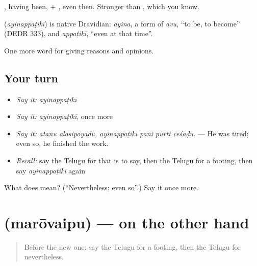 , having been, + , even then. Stronger than , which you know.

\begin{cousinweb}
\textbf{} (\emph{ayinappaṭikī}) is native Dravidian: \emph{ayina}, a form of \emph{avu}, \textquotedblleft{}to be, to become\textquotedblright{} (DEDR 333), and \emph{appaṭikī}, \textquotedblleft{}even at that time\textquotedblright{}.
\end{cousinweb}

\begin{grammarlens}[title={What you've built}]
One more word for giving reasons and opinions.
\end{grammarlens}

\subsection*{Your turn}
\begin{itemize}
\raggedright
  \item \emph{Say it:} \emph{ayinappaṭikī}
  \item \emph{Say it:} \emph{ayinappaṭikī}, once more
  \item \emph{Say it:} \emph{atanu alasipōyāḍu, ayinappaṭikī pani pūrti cēśāḍu.} — He was tired; even so, he finished the work.
  \item \emph{Recall:} say the Telugu for that is to say, then the Telugu for a footing, then say \emph{ayinappaṭikī} again
\end{itemize}

\begin{tcolorbox}[breakable,colback=teal!4,colframe=teal!35!black,title={Before you move on}]
What does  mean? (\textquotedblleft{}Nevertheless; even so\textquotedblright{}.) Say it once more.
\end{tcolorbox}
\section[\texorpdfstring{\te{మరోవైపు} (marōvaipu)}{మరోవైపు (marōvaipu)}]{ (marōvaipu) — on the other hand}

\label{lesson:TE-C396-marovaipu}



\begin{quote}
Before the new one: say the Telugu for a footing, then the Telugu for nevertheless.
\end{quote}

